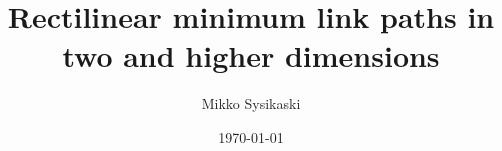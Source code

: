 \documentclass[english,gradu]{tktltiki2018}
\begin{document}
\newcommand\nodecs[1]{\ensuremath{\textsc{ivc}(#1)}\xspace}
\newcommand\nodeps[1]{\ensuremath{\textsc{ivp}(#1)}\xspace}
\newcommand\subtree[1]{\ensuremath{\texttt{subtree}(#1)}\xspace}
\newcommand\subtreep[1]{\ensuremath{\texttt{subtreeP}(#1)}\xspace}
\newcommand\hasrect[1]{\ensuremath{\texttt{hasrect}(#1)}\xspace}
\newcommand\hasbits[2]{\ensuremath{\texttt{hasbits}(#1)[#2]}\xspace}
\newcommand\hasbita[1]{\ensuremath{\texttt{hasbits}(#1)}\xspace}

\newcommand\rect[1]{\ensuremath{\textsc{rect}(#1)}\xspace}

\newcommand\pop[1]{\ensuremath{\textsc{pop}(#1)}\xspace}

\newcommand\y[1]{\ensuremath{{#1}_y}\xspace}
\newcommand\x[1]{\ensuremath{{#1}_x}\xspace}
\newcommand\xrange[1]{\ensuremath{x(#1)}\xspace}
\newcommand\yrange[1]{\ensuremath{y(#1)}\xspace}
\newcommand\zrange[1]{\ensuremath{z(#1)}\xspace}
\newcommand\xranget[2]{\ensuremath{x(#1)_{#2}}\xspace}
\newcommand\yranget[2]{\ensuremath{y(#1)_{#2}}\xspace}
\newcommand\nbs[1]{\ensuremath{\textsc{nbs}{(#1)}}\xspace}
\newcommand\nbsd[2]{\ensuremath{\textsc{nbs}_{#2}{(#1)}}\xspace}
\newcommand\obsd[2]{\ensuremath{\textsc{obs}_{#2}{(#1)}}\xspace}

\newcommand\decomp[1]{\ensuremath{\textsc{dec}_{#1}}\xspace}
\newcommand\sweep[2]{\ensuremath{\textsc{sweep}_{#2}{(#1)}}\xspace}
\newcommand\stepof[1]{\ensuremath{\textsc{step}{(#1)}}\xspace}
\newcommand\proj[2]{\ensuremath{\text{proj}_{#1}(#2)}\xspace}

\newcommand\rotr[1]{\ensuremath{\top #1}\xspace}
\newcommand\vecof[1]{\ensuremath{\left [#1\right ]}\xspace}
\newcommand\sline[1]{\ensuremath{S_{#1}}\xspace}
\newcommand\intert[2]{\ensuremath{\textsc{interval}_{#1}(#2)}\xspace}
\newcommand\point[1]{\ensuremath{\left ({#1}\right )}\xspace}

\newcommand\cellE{\ensuremath{\mathsf{CellEvent}}\xspace}
\newcommand\cellEs{\ensuremath{\mathsf{CellEvent}}s\xspace}
\newcommand\obsE{\ensuremath{\mathsf{ObstacleEvent}}\xspace}
\newcommand\obsEs{\ensuremath{\mathsf{ObstacleEvent}}s\xspace}
\newcommand\addE{\ensuremath{\mathsf{AddRangeEvent}}\xspace}
\newcommand\addEs{\ensuremath{\mathsf{AddRangeEvent}}s\xspace}
\newcommand\cellof[1]{\ensuremath{\text{cell}(#1)}\xspace}
\newcommand\rectof[1]{\ensuremath{\text{rect}(#1)}\xspace}
\newcommand\hrectof[1]{\ensuremath{\text{hyperrect}(#1)}\xspace}


\title{Rectilinear minimum link paths in two and higher dimensions}
\author{Mikko Sysikaski}
\date{\today}
\end{document}
